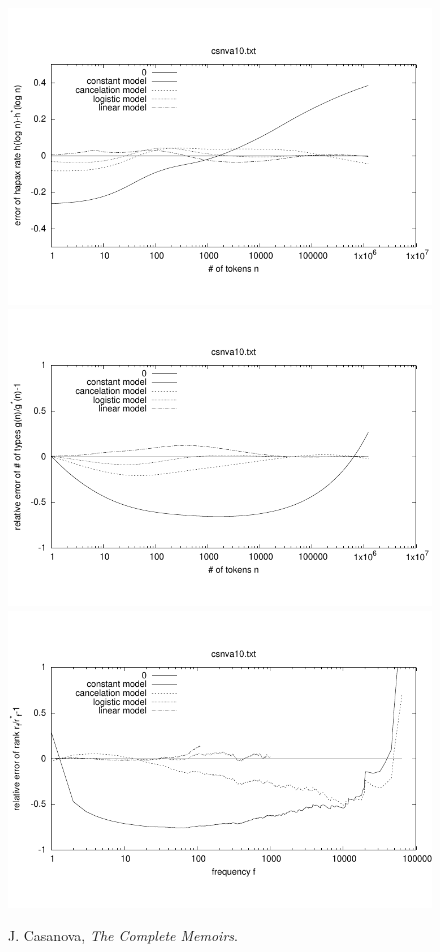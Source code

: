\documentclass[a4paper,12pt]{article}
\begin{document}
\begin{figure}[p]
  \centering
  \vspace{-2em}
  \includegraphics[width=0.8\columnwidth]{output/herdan/csnva10_27/token_ratio_residual.pdf}
  \\[-3em]
  \includegraphics[width=0.8\columnwidth]{output/herdan/csnva10_27/token_residual.pdf}
  \\[-3em]
  \includegraphics[width=0.8\columnwidth]{output/herdan/csnva10_27/frequency_residual.pdf}
  \vspace{-2em}
  \caption{J. Casanova, \emph{The Complete Memoirs}.\label{figcsnva10R}}
\end{figure}
\end{document}

